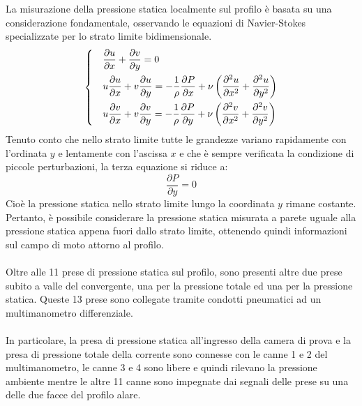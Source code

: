 \noindent La misurazione della pressione statica localmente sul profilo è basata su una considerazione fondamentale, osservando le equazioni di Navier-Stokes specializzate per lo strato limite bidimensionale.
\begin{equation*}
    \begin{dcases}
        &\frac{\partial u}{\partial x} + \frac{\partial v}{\partial y} = 0\\
        & u\frac{\partial u}{\partial x} + v\frac{\partial u}{\partial y} = -\frac1\rho \frac{\partial P}{\partial x} + \nu\left( \frac{\partial^2 u}{\partial x^2} + \frac{\partial^2 u}{\partial y^2} \right)\\
        & u\frac{\partial v}{\partial x} + v\frac{\partial v}{\partial y} = -\frac1\rho \frac{\partial P}{\partial y} + \nu\left( \frac{\partial^2 v}{\partial x^2} + \frac{\partial^2 v}{\partial y^2} \right)
    \end{dcases}
\end{equation*}
Tenuto conto che nello strato limite tutte le grandezze variano rapidamente con l'ordinata $y$ e lentamente con l'ascissa $x$ e che è sempre verificata la condizione di piccole perturbazioni, la terza equazione si riduce a:
\begin{equation*}
    \frac{\partial P}{\partial y} = 0
\end{equation*}
Cioè la pressione statica nello strato limite lungo la coordinata $y$ rimane costante. Pertanto, è possibile considerare la pressione statica misurata a parete uguale alla pressione statica appena fuori dallo strato limite, ottenendo quindi informazioni sul campo di moto attorno al profilo.\\\\
Oltre alle 11 prese di pressione statica sul profilo, sono presenti altre due prese subito a valle del convergente, una per la pressione totale ed una per la pressione statica. Queste 13 prese sono collegate tramite condotti pneumatici ad un multimanometro differenziale.\\\\
In particolare, la presa di pressione statica all'ingresso della camera di prova e la presa di pressione totale della corrente sono connesse con le canne 1 e 2 del multimanometro, le canne 3 e 4 sono libere e quindi rilevano la pressione ambiente mentre le altre 11 canne sono impegnate dai segnali delle prese su una delle due facce del profilo alare.
